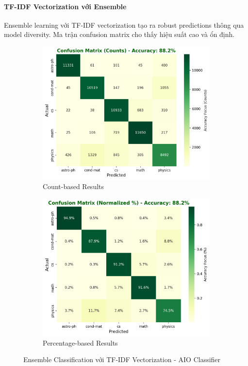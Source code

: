 \paragraph{TF-IDF Vectorization với Ensemble}

Ensemble learning với TF-IDF vectorization tạo ra robust predictions thông qua model diversity. Ma trận confusion matrix cho thấy hiệu suất cao và ổn định.

\begin{figure}[H]
\centering
\begin{subfigure}{0.48\textwidth}
    \centering
    \includegraphics[width=\textwidth]{image/ensemble_tfidf_count.png}
    \caption{Count-based Results}
    \label{fig:ensemble_tfidf_count_improvements}
\end{subfigure}
\hfill
\begin{subfigure}{0.48\textwidth}
    \centering
    \includegraphics[width=\textwidth]{image/ensemble_tfidf_percent.png}
    \caption{Percentage-based Results}
    \label{fig:ensemble_tfidf_percent_improvements}
\end{subfigure}
\caption{Ensemble Classification với TF-IDF Vectorization - AIO Classifier}
\label{fig:ensemble_tfidf_results_improvements}
\end{figure}

